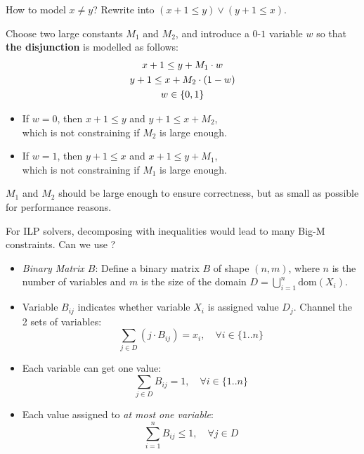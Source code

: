 \documentclass{cons-beamer}
\begin{document}
\begin{frame}
  \begin{example}
    How to model $x \neq y$? 
    Rewrite into $(x + 1 \leq y) \lor (y + 1 \leq x)$. 

    Choose two large constants $M_1$ and $M_2$, and introduce a
    $0$-$1$ variable $w$ so that \textbf{the disjunction} is modelled as
    follows:
    \begin{gather*}
      x + 1 \leq y + M_1 \cdot    w  \\
      y + 1 \leq x + M_2 \cdot (1-w) \\
      w \in \left\{0,1\right\}
    \end{gather*}\vfill
    \begin{itemize}
      \item If $w = 0$, then $x + 1 \leq y$ and
        $y + 1 \leq x + M_2$, \\
        which is not constraining if $M_2$ is large enough.
      \item If $w = 1$, then $y + 1 \leq x$ and
        $x + 1 \leq y + M_1$, \\
        which is not constraining if $M_1$ is large enough.
    \end{itemize}
    $M_1$ and $M_2$ should be large enough to ensure correctness, but
    as small as possible for performance reasons. \\
  \end{example}
\end{frame}

\begin{frame}%
  For ILP solvers, decomposing  with inequalities would lead to many Big-M constraints. Can we use ?
  \vfill

  \begin{itemize}
    \item \textit{Binary Matrix \(B\)}: Define a binary matrix \(B\) of shape \((n, m)\), where \(n\) is the number of variables and \(m\) is the size of the domain $D = \bigcup_{i=1}^{n} \text{dom}(X_i)$. 
    \vspace{3mm}        

    \item Variable $B_{ij}$ indicates whether variable $X_i$ is assigned value $D_j$. Channel the 2 sets of variables:
    \[
    \sum_{j\in D} (j \cdot B_{ij}) = x_i, \quad \forall i \in \{1..n\}
    \]

    \item Each variable can get one value:
    \[
    \sum_{j \in D} B_{ij} = 1, \quad \forall i \in \{1..n\}
    \]

    \item Each value assigned to \textit{at most one variable}:
    \[
    \sum_{i=1}^{n} B_{ij} \leq 1, \quad \forall j \in D
    \]
  \end{itemize}
\end{frame}
\end{document}
